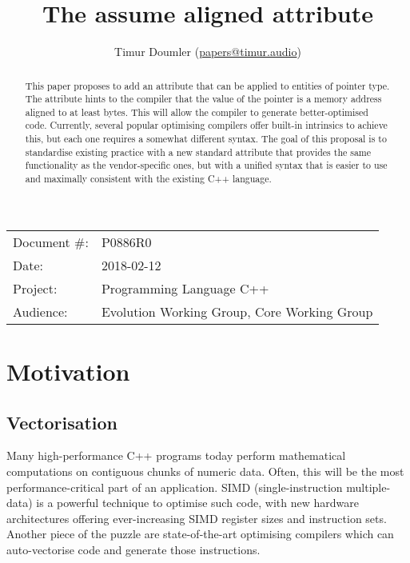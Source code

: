 


\title{The assume aligned attribute}
\author{ Timur Doumler \small(\href{mailto:papers@timur.audio}{papers@timur.audio}) }
\date{}
\maketitle

\begin{tabular}{ll}
Document \#: & P0886R0 \\
Date: &2018-02-12 \\
Project: & Programming Language C++ \\
Audience: & Evolution Working Group, Core Working Group
\end{tabular}

\begin{abstract}
This paper proposes to add an attribute  that can be applied to entities of pointer type. The attribute hints to the compiler that the value of the pointer is a memory address aligned to at least  bytes. This will allow the compiler to generate better-optimised code. Currently, several popular optimising compilers offer built-in  intrinsics to achieve this, but each one requires a somewhat different syntax. The goal of this proposal is to standardise existing practice with a new standard attribute that provides the same functionality as the vendor-specific ones, but with a unified syntax that is easier to use and maximally consistent with the existing C++ language.
\end{abstract}

\section{Motivation}

\subsection{Vectorisation}

Many high-performance C++ programs today perform mathematical computations on contiguous chunks of numeric data. Often, this will be the most performance-critical part of an application. SIMD (single-instruction multiple-data) is a powerful technique to optimise such code, with new hardware architectures offering ever-increasing SIMD register sizes and instruction sets. Another piece of the puzzle are state-of-the-art optimising compilers which can auto-vectorise code and generate those instructions.

